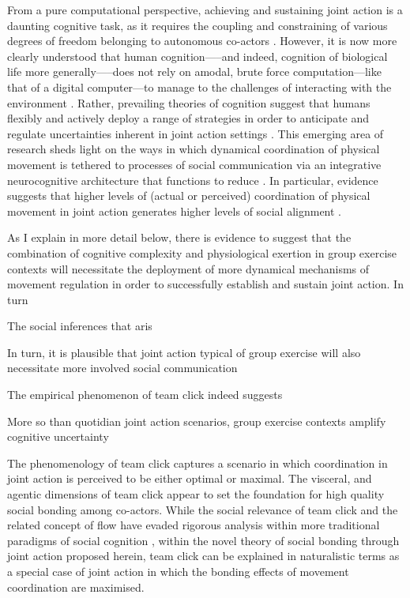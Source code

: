 \begin{CJK}{UTF8}{gbsn}
From a pure computational perspective, achieving and sustaining joint action is a daunting cognitive task, as it requires the coupling and constraining of various degrees of freedom belonging to autonomous co-actors \citep{Bernstein1967,Turvey1978}.  However, it is now more clearly understood that human cognition—--and indeed, cognition of biological life more generally—--does not rely on amodal, brute force computation---like that of a digital computer---to manage to the challenges of interacting with the environment \citep{Yufik2013}.  Rather, prevailing theories of cognition suggest that humans flexibly and actively deploy a range of strategies in order to anticipate and regulate uncertainties inherent in joint action settings \citep{Semin2008,Friston2010,Clark2015}.
This emerging area of research sheds light on the ways in which dynamical coordination of physical movement is tethered to processes of social communication via an integrative neurocognitive architecture that functions to reduce \citep{Semin2008,Wheatley2016,Ramstead2016}.
In particular, evidence suggests that higher levels of (actual or perceived) coordination of physical movement in joint action generates higher levels of social alignment \citep[]{Semin2008,Wheatley2012,Launay2016,Mogan2017}.


As I explain in more detail below, there is evidence to suggest that the combination of cognitive complexity and physiological exertion in group exercise contexts will necessitate the deployment of more dynamical mechanisms of movement regulation in order to successfully establish and sustain joint action.  In turn

The social inferences that aris

In turn, it is plausible that joint action typical of group exercise will also necessitate more involved social communication

The empirical phenomenon of team click indeed suggests

More so than quotidian joint action scenarios, group exercise contexts amplify cognitive uncertainty

The phenomenology of team click captures a scenario in which coordination in joint action is perceived to be either optimal or maximal.  The visceral, and agentic dimensions of team click appear to set the foundation for high quality social bonding among co-actors.  While the social relevance of team click and the related concept of flow have evaded rigorous analysis within more traditional paradigms of social cognition \citep[for explanations as to why, see][]{Dietrich2004,Slingerland2014}, within the novel theory of social bonding through joint action proposed herein, team click can be explained in naturalistic terms as a special case of joint action in which the bonding effects of movement coordination are maximised.


\end{CJK}
